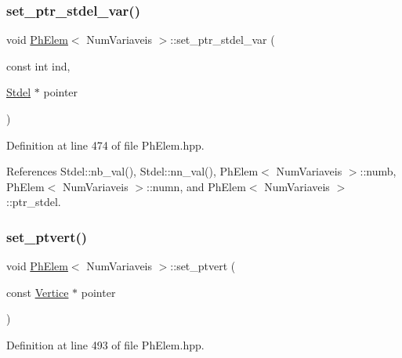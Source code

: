 \mbox{\label{classPhElem_a52fdbcf2283aacd8fdf9672018d74e4a}} 
\subsubsection{\texorpdfstring{set\+\_\+ptr\+\_\+stdel\+\_\+var()}{set\_ptr\_stdel\_var()}}
{\footnotesize\ttfamily void \hyperlink{classPhElem}{Ph\+Elem}$<$ Num\+Variaveis $>$\+::set\+\_\+ptr\+\_\+stdel\+\_\+var (\begin{DoxyParamCaption}\item[{const int}]{ind,  }\item[{\hyperlink{classStdel}{Stdel} $\ast$}]{pointer }\end{DoxyParamCaption})\hspace{0.3cm}{\ttfamily [inherited]}}



Definition at line 474 of file Ph\+Elem.\+hpp.



References Stdel\+::nb\+\_\+val(), Stdel\+::nn\+\_\+val(), Ph\+Elem$<$ Num\+Variaveis $>$\+::numb, Ph\+Elem$<$ Num\+Variaveis $>$\+::numn, and Ph\+Elem$<$ Num\+Variaveis $>$\+::ptr\+\_\+stdel.

\mbox{\label{classPhElem_a8ed472a9e135b1e16b962c14df8f2225}} 
\subsubsection{\texorpdfstring{set\+\_\+ptvert()}{set\_ptvert()}}
{\footnotesize\ttfamily void \hyperlink{classPhElem}{Ph\+Elem}$<$ Num\+Variaveis $>$\+::set\+\_\+ptvert (\begin{DoxyParamCaption}\item[{const \hyperlink{structVertice}{Vertice} $\ast$}]{pointer }\end{DoxyParamCaption})\hspace{0.3cm}{\ttfamily [inherited]}}



Definition at line 493 of file Ph\+Elem.\+hpp.




